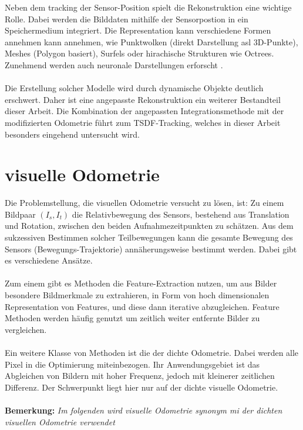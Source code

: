 \documentclass[12pt,DIV=15,BCOR=15mm,twoside,headsepline,abstract=true,listof=totoc,bibliography=totoc]{scrreprt}
\theoremstyle{remark}    %
\begin{document}
    Neben dem tracking der Sensor-Position spielt die Rekonstruktion eine wichtige Rolle. Dabei werden die Bilddaten mithilfe der Sensorpostion in ein 
    Speichermedium integriert. Die Representation kann verschiedene Formen annehmen kann annehmen, wie Punktwolken (direkt Darstellung asl 3D-Punkte), 
    Meshes (Polygon basiert), Surfels oder hirachische Strukturen wie Octrees. Zunehmend werden auch neuronale Darstellungen erforscht
    \cite{annurev:/content/journals/10.1146/annurev-control-040423-030709}.\\\\
    Die Erstellung solcher Modelle wird durch dynamische Objekte deutlich erschwert. Daher ist eine angepasste Rekonstruktion ein weiterer Bestandteil dieser Arbeit.
    Die Kombination der angepassten Integrationsmethode mit der modifizierten Odometrie führt zum \ac{TSDF}-Tracking, welches in dieser Arbeit besonders 
    eingehend untersucht wird.

    \section{visuelle Odometrie}
    Die Problemstellung, die visuellen Odometrie versucht zu lösen, ist: Zu einem Bildpaar $(I_s,I_t)$ die Relativbewegung des Sensors, bestehend aus Translation 
    und Rotation, zwischen den beiden Aufnahmezeitpunkten zu schätzen. 
    Aus dem sukzessiven Bestimmen solcher Teilbewegungen kann die gesamte Bewegung des Sensors (Bewegungs-Trajektorie) annäherungsweise bestimmt werden. 
    Dabei gibt es verschiedene Ansätze.\\\\
    Zum einem gibt es Methoden die Feature-Extraction nutzen, um aus Bilder besondere Bildmerkmale zu extrahieren, in Form von hoch dimensionalen 
    Representation von Features, und diese dann iterative abzugleichen. Feature Methoden werden häufig genutzt um zeitlich weiter
    entfernte Bilder zu vergleichen.\cite{opencv_matcher_tutorial,Mur_Artal_2015}\\\\
    Ein weitere Klasse von Methoden ist die der dichte Odometrie. Dabei werden alle Pixel in die Optimierung miteinbezogen. Ihr Anwendungsgebiet ist 
    das Abgleichen von Bildern mit hoher Frequenz, jedoch mit kleinerer zeitlichen Differenz. Der Schwerpunkt liegt hier nur auf der dichte visuelle Odometrie.\\\\ 
    \textbf{Bemerkung:} \emph{Im folgenden wird visuelle Odometrie synonym mi der dichten visuellen Odometrie verwendet}\\\\
\end{document}
